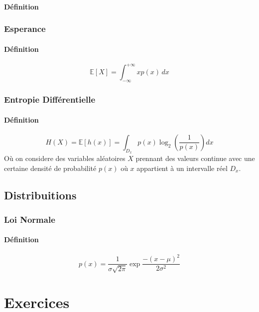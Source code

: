 \documentclass{article}
\begin{document}
\paragraph{Définition}

\subsubsection{Esperance}
\paragraph{Définition}
\begin{equation}\label{eq:esperance_continue}
    \boxed{
        \mathbb{E}[X] = \int_{-\infty}^{+\infty} x p(x)\,dx
    }
\end{equation}

\subsubsection{Entropie Différentielle}
\paragraph{Définition}
\begin{equation}\label{eq:entropie_differentielle}
    \boxed{
        H(X) = \mathbb{E}[h(x)] = \int_{D_x} p(x) \log_{2} \left( \frac{1}{p(x)} \right) dx
    }
\end{equation}
Où on considere des variables aléatoires $X$ prennant des valeurs continue avec une certaine densité de probabilité $p(x)$ où $x$ appartient à un intervalle réel $D_x$.

\subsection{Distribuitions}
\subsubsection{Loi Normale}
\paragraph{Définition}
\begin{equation}\label{eq:loi_normale}
    \boxed{
        p(x) = \frac{1}{\sigma\sqrt{2\pi}} \exp{\frac{-(x - \mu)^2}{2\sigma^2}}
    }
\end{equation}


\section{Exercices}
\end{document}
